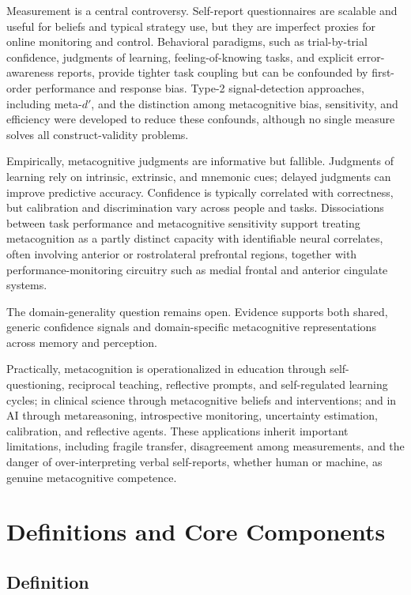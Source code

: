 \documentclass[a4paper]{article}
\begin{document}
   Measurement is a central controversy. Self-report questionnaires are scalable and useful for beliefs and typical strategy use, but they are imperfect proxies for online monitoring and control. Behavioral paradigms, such as trial-by-trial confidence, judgments of learning, feeling-of-knowing tasks, and explicit error-awareness reports, provide tighter task coupling but can be confounded by first-order performance and response bias. Type-2 signal-detection approaches, including meta-$d'$, and the distinction among metacognitive bias, sensitivity, and efficiency were developed to reduce these confounds, although no single measure solves all construct-validity problems.

   Empirically, metacognitive judgments are informative but fallible. Judgments of learning rely on intrinsic, extrinsic, and mnemonic cues; delayed judgments can improve predictive accuracy. Confidence is typically correlated with correctness, but calibration and discrimination vary across people and tasks. Dissociations between task performance and metacognitive sensitivity support treating metacognition as a partly distinct capacity with identifiable neural correlates, often involving anterior or rostrolateral prefrontal regions, together with performance-monitoring circuitry such as medial frontal and anterior cingulate systems.

   The domain-generality question remains open. Evidence supports both shared, generic confidence signals and domain-specific metacognitive representations across memory and perception.

   Practically, metacognition is operationalized in education through self-questioning, reciprocal teaching, reflective prompts, and self-regulated learning cycles; in clinical science through metacognitive beliefs and interventions; and in AI through metareasoning, introspective monitoring, uncertainty estimation, calibration, and reflective agents. These applications inherit important limitations, including fragile transfer, disagreement among measurements, and the danger of over-interpreting verbal self-reports, whether human or machine, as genuine metacognitive competence.

   \section{Definitions and Core Components}

   \subsection{Definition}
\end{document}
